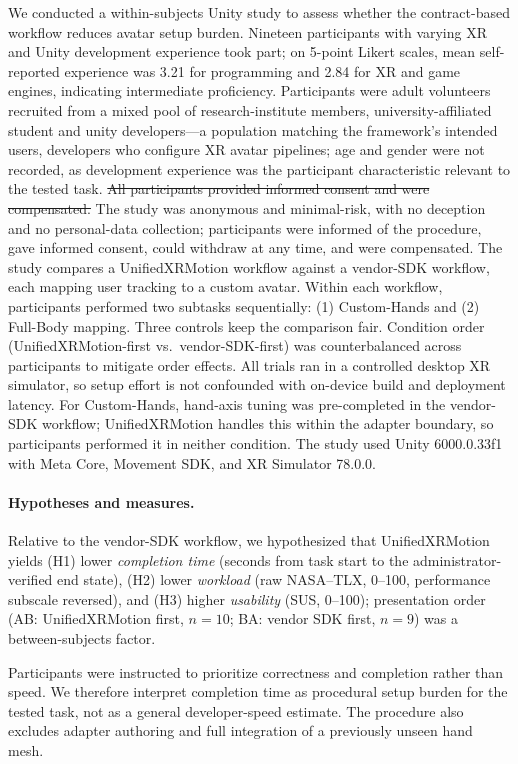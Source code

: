 \documentclass[runningheads]{llncs}
\newcommand{\radd}[1]{\textcolor{revadd}{#1}}
\newcommand{\rdel}[1]{\textcolor{revdel}{\sout{#1}}}
\newcommand{\radd}[1]{#1}
\newcommand{\rdel}[1]{}
\begin{document}
	We conducted a within-subjects Unity study to assess whether the contract-based workflow reduces avatar setup burden.
	Nineteen participants with varying XR and Unity development experience took part; on 5-point Likert scales, mean self-reported experience was 3.21 for programming and 2.84 for XR and game engines, indicating intermediate proficiency.
	\radd{Participants were adult volunteers recruited from a mixed pool of research-institute members, university-affiliated student and unity developers---a population matching the framework's intended users, developers who configure XR avatar pipelines; age and gender were not recorded, as development experience was the participant characteristic relevant to the tested task.}
	\rdel{All participants provided informed consent and were compensated.}
	\radd{The study was anonymous and minimal-risk, with no deception and no personal-data collection; participants were informed of the procedure, gave informed consent, could withdraw at any time, and were compensated.}
	The study compares a UnifiedXRMotion workflow against a vendor-SDK workflow, each mapping user tracking to a custom avatar.
	Within each workflow, participants performed two subtasks sequentially: (1) Custom-Hands and (2) Full-Body mapping.
	Three controls keep the comparison fair.
	Condition order (UnifiedXRMotion-first vs.\ vendor-SDK-first) was counterbalanced across participants to mitigate order effects.
	All trials ran in a controlled desktop XR simulator, so setup effort is not confounded with on-device build and deployment latency.
	For Custom-Hands, hand-axis tuning was pre-completed in the vendor-SDK workflow; UnifiedXRMotion handles this within the adapter boundary, so participants performed it in neither condition.
	The study used Unity 6000.0.33f1 with Meta Core, Movement SDK, and XR Simulator 78.0.0.

\paragraph{Hypotheses and measures.}
	\radd{Relative to the vendor-SDK workflow, we hypothesized that UnifiedXRMotion yields (H1) lower \emph{completion time} (seconds from task start to the administrator-verified end state), (H2) lower \emph{workload} (raw NASA--TLX, 0--100, performance subscale reversed), and (H3) higher \emph{usability} (SUS, 0--100); presentation order (AB: UnifiedXRMotion first, $n=10$; BA: vendor SDK first, $n=9$) was a between-subjects factor.}

Participants were instructed to prioritize correctness and completion rather than speed. We therefore interpret completion time as procedural setup burden for the tested task, not as a general developer-speed estimate. The procedure also excludes adapter authoring and full integration of a previously unseen hand mesh.
\end{document}
